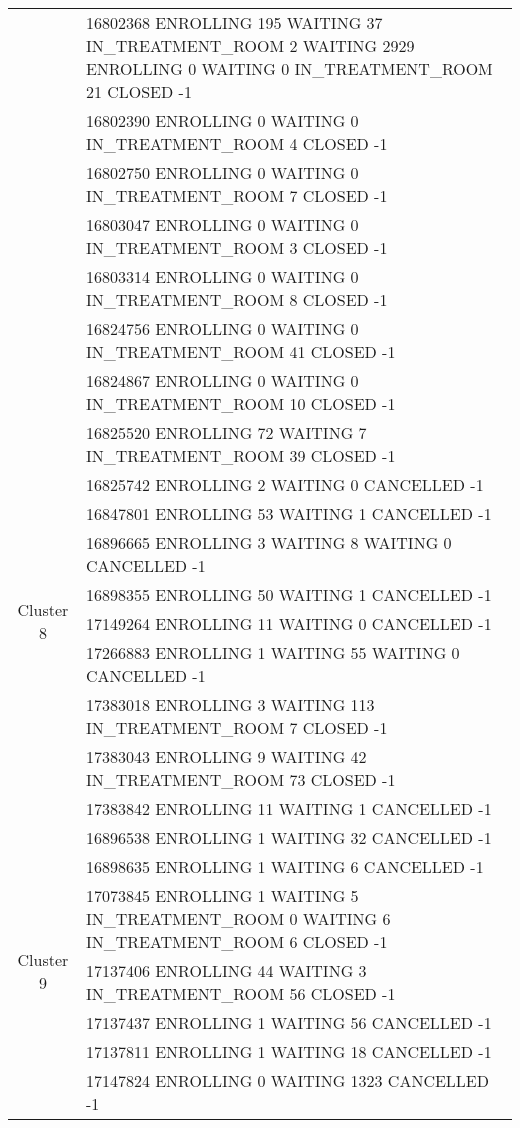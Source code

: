 {\begin{longtable}{|c|p{}|}
		& 16802368 ENROLLING 195 WAITING 37 IN\_TREATMENT\_ROOM 2 WAITING 2929 ENROLLING 0 WAITING 0 IN\_TREATMENT\_ROOM 21 CLOSED -1 \\
		& 16802390 ENROLLING 0 WAITING 0 IN\_TREATMENT\_ROOM 4 CLOSED -1 \\
		& 16802750 ENROLLING 0 WAITING 0 IN\_TREATMENT\_ROOM 7 CLOSED -1 \\
		& 16803047 ENROLLING 0 WAITING 0 IN\_TREATMENT\_ROOM 3 CLOSED -1 \\
		& 16803314 ENROLLING 0 WAITING 0 IN\_TREATMENT\_ROOM 8 CLOSED -1 \\
		& 16824756 ENROLLING 0 WAITING 0 IN\_TREATMENT\_ROOM 41 CLOSED -1 \\
		& 16824867 ENROLLING 0 WAITING 0 IN\_TREATMENT\_ROOM 10 CLOSED -1 \\
		\hline
		\multirow{10}{*}{Cluster 8}
		& 16825520 ENROLLING 72 WAITING 7 IN\_TREATMENT\_ROOM 39 CLOSED -1 \\
		& 16825742 ENROLLING 2 WAITING 0 CANCELLED -1 \\
		& 16847801 ENROLLING 53 WAITING 1 CANCELLED -1 \\
		& 16896665 ENROLLING 3 WAITING 8 WAITING 0 CANCELLED -1 \\
		& 16898355 ENROLLING 50 WAITING 1 CANCELLED -1 \\
		& 17149264 ENROLLING 11 WAITING 0 CANCELLED -1 \\
		& 17266883 ENROLLING 1 WAITING 55 WAITING 0 CANCELLED -1 \\
		& 17383018 ENROLLING 3 WAITING 113 IN\_TREATMENT\_ROOM 7 CLOSED -1 \\
		& 17383043 ENROLLING 9 WAITING 42 IN\_TREATMENT\_ROOM 73 CLOSED -1 \\
		& 17383842 ENROLLING 11 WAITING 1 CANCELLED -1 \\
		\hline
		\multirow{10}{*}{Cluster 9}
		& 16896538 ENROLLING 1 WAITING 32 CANCELLED -1 \\
		& 16898635 ENROLLING 1 WAITING 6 CANCELLED -1 \\
		& 17073845 ENROLLING 1 WAITING 5 IN\_TREATMENT\_ROOM 0 WAITING 6 IN\_TREATMENT\_ROOM 6 CLOSED -1 \\
		& 17137406 ENROLLING 44 WAITING 3 IN\_TREATMENT\_ROOM 56 CLOSED -1 \\
		& 17137437 ENROLLING 1 WAITING 56 CANCELLED -1 \\
		& 17137811 ENROLLING 1 WAITING 18 CANCELLED -1 \\
		& 17147824 ENROLLING 0 WAITING 1323 CANCELLED -1 \\

\end{longtable}}
